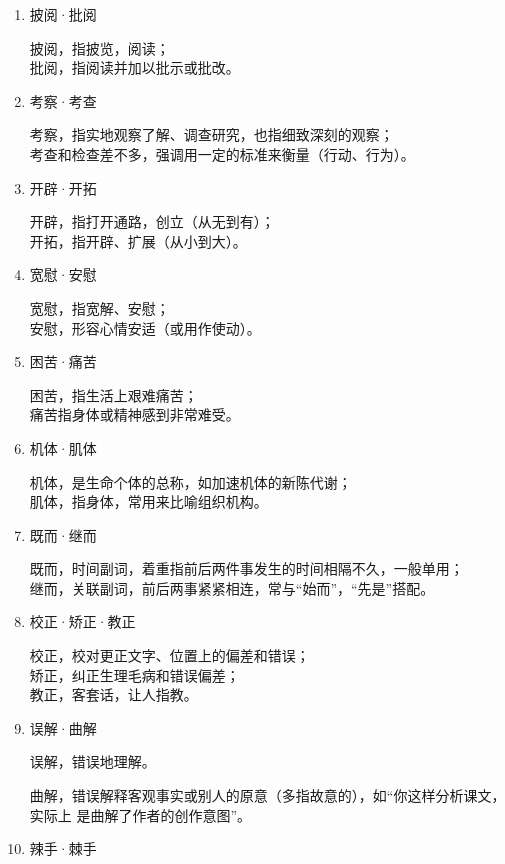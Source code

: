 \documentclass[final,oneside]{ctexbook}
\begin{document}
\begin{enumerate}
  \item 披阅·批阅

    披阅，指披览，阅读；\\
    批阅，指阅读并加以批示或批改。

  \item 考察·考查

    考察，指实地观察了解、调查研究，也指细致深刻的观察；\\
    考查和检查差不多，强调用一定的标准来衡量（行动、行为）。

  \item 开辟·开拓

    开辟，指打开通路，创立（从无到有）；\\
    开拓，指开辟、扩展（从小到大）。

  \item 宽慰·安慰

    宽慰，指宽解、安慰；\\
    安慰，形容心情安适（或用作使动）。

  \item 困苦·痛苦

    困苦，指生活上艰难痛苦；\\
    痛苦指身体或精神感到非常难受。

  \item 机体·肌体

    机体，是生命个体的总称，如加速机体的新陈代谢；\\
    肌体，指身体，常用来比喻组织机构。

  \item 既而·继而

    既而，时间副词，着重指前后两件事发生的时间相隔不久，一般单用；\\
    继而，关联副词，前后两事紧紧相连，常与“始而”，“先是”搭配。

  \item 校正·矫正·教正

    校正，校对更正文字、位置上的偏差和错误；\\
    矫正，纠正生理毛病和错误偏差；\\
    教正，客套话，让人指教。

  \item 误解·曲解

    误解，错误地理解。

    曲解，错误解释客观事实或别人的原意（多指故意的），如“你这样分析课文，实际上
    是曲解了作者的创作意图”。

  \item 辣手·棘手


\end{enumerate}
\end{document}
